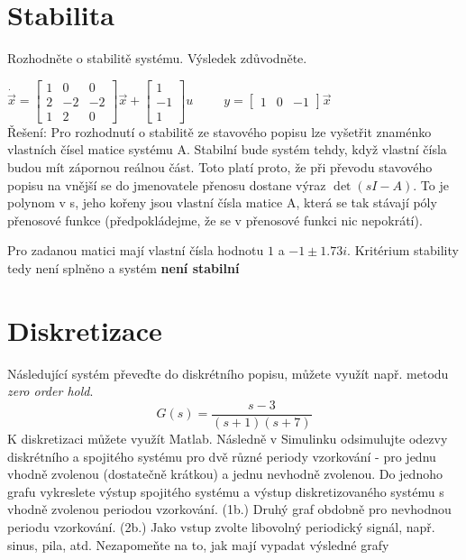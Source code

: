 \documentclass[twoside]{article}
\begin{document}
\section{Stabilita}
\label{sec:ukol6}
Rozhodněte o stabilitě systému. Výsledek zdůvodněte.

\begin{math}
	\dot{\vec{x}} = \begin{bmatrix}
		1 & 0 & 0 \\
		2 & -2 & -2 \\
		1 & 2 & 0
	\end{bmatrix} \vec{x} + \begin{bmatrix}
		1 \\
		-1 \\
		1
\end{bmatrix} u ~~~~~~~~~~~
y = \begin{bmatrix}
	1 & 0 & -1
\end{bmatrix} \vec{x}
\end{math} \\
Řešení: Pro rozhodnutí o stabilitě ze stavového popisu lze vyšetřit znaménko vlastních čísel matice systému A.
Stabilní bude systém tehdy, když vlastní čísla budou mít zápornou reálnou část. Toto platí proto, že při převodu
stavového popisu na vnější se do jmenovatele přenosu dostane výraz $\det(sI - A)$. To je polynom v s, jeho kořeny
jsou vlastní čísla matice A, která se tak stávají póly přenosové funkce (předpokládejme, že se v přenosové funkci nic nepokrátí).

Pro zadanou matici mají vlastní čísla hodnotu $1$ a $ -1 \pm 1.73 i$. Kritérium stability tedy není splněno a systém \textbf{není stabilní} 


\section{Diskretizace}
\label{sec:ukol7}
Následující systém převeďte do diskrétního popisu, můžete využít např. metodu \textit{zero order hold}.
\begin{equation}
	G(s) = \frac{s-3}{(s+1)(s+7)}
\end{equation}
K diskretizaci můžete využít Matlab. Následně v Simulinku odsimulujte odezvy diskrétního a spojitého systému
pro dvě různé periody vzorkování - pro jednu vhodně zvolenou (dostatečně krátkou) a jednu nevhodně zvolenou.
Do jednoho grafu vykreslete výstup spojitého systému a výstup diskretizovaného systému s vhodně zvolenou
periodou vzorkování. (1b.) Druhý graf obdobně pro nevhodnou periodu vzorkování. (2b.) Jako vstup zvolte
libovolný periodický signál, např. sinus, pila, atd. Nezapomeňte na to, jak mají vypadat výsledné grafy
\end{document}
